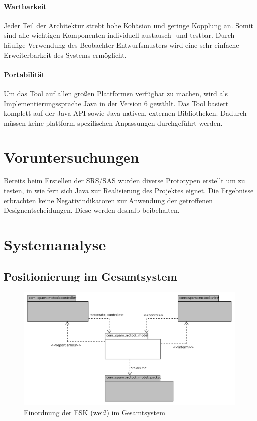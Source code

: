 \paragraph{Wartbarkeit} Jeder Teil der Architektur strebt hohe
Kohäsion und geringe Kopplung an. Somit sind alle wichtigen Komponenten
individuell austausch- und testbar. Durch häufige Verwendung des
Beobachter-Entwurfsmusters wird eine sehr einfache Erweiterbarkeit des Systems
ermöglicht.

\paragraph{Portabilität} Um das Tool auf allen großen Plattformen verfügbar zu
machen, wird als Implementierungssprache Java in der Version 6 gewählt. Das Tool
basiert komplett auf der Java API sowie Java-nativen, externen Bibliotheken.
Dadurch müssen keine plattform-spezifischen Anpassungen durchgeführt werden.

\section{Voruntersuchungen}
Bereits beim Erstellen der SRS/SAS wurden diverse Prototypen erstellt um zu
testen, in wie fern sich Java zur Realisierung des Projektes eignet. Die
Ergebnisse erbrachten keine Negativindikatoren zur Anwendung der
getroffenen Designentscheidungen. Diese werden deshalb beibehalten.

\section{Systemanalyse}

\subsection{Positionierung im Gesamtsystem}

\begin{figure}[H]
\center
\includegraphics[width=12cm]{images/Einordnung.pdf}
\caption{Einordnung der ESK (weiß) im Gesamtsystem}
\end{figure}

